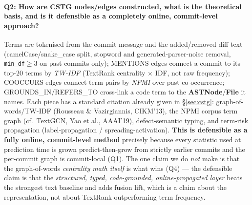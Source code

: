 \documentclass[11pt,a4paper]{article}
\newcommand{\code}[1]{\texttt{#1}}
\newcommand{\node}[1]{\textcolor{kgblue}{\textbf{#1}}}
\newcommand{\edge}[1]{\textsc{#1}}
\begin{document}
	\paragraph{Q2: How are CSTG nodes/edges constructed, what is the theoretical
	basis, and is it defensible as a completely online, commit-level approach?}
	Terms are tokenised from the commit message and the added/removed diff text
	(camelCase/snake\_case split, stopword and generated-parser-noise removal,
	\code{min\_df}$\ge3$ on past commits only); \edge{MENTIONS} edges connect a commit
	to its top-$20$ terms by \emph{TW-IDF} (TextRank centrality $\times$ IDF, not raw
	frequency); \edge{COOCCURS} edges connect term pairs by \emph{NPMI} over past
	co-occurrence; \edge{GROUNDS\_IN}/\edge{REFERS\_TO} cross-link a code term to the
	\node{ASTNode}/\node{File} it names. Each piece has a standard citation already
	given in \S\ref{sec:cstg}: graph-of-words/TW-IDF (Rousseau \& Vazirgiannis,
	CIKM'13), the NPMI corpus term graph (cf.\ TextGCN, Yao et al., AAAI'19),
	defect-semantic typing, and term-risk propagation (label-propagation /
	spreading-activation). \textbf{This is defensible as a fully online, commit-level
	method} precisely because every statistic used at prediction time is grown
	predict-then-grow from strictly earlier commits and the per-commit graph is
	commit-local (Q1). The one claim we do \emph{not} make is that the
	graph-of-words \emph{centrality math itself} is what wins (Q4) --- the defensible
	claim is that the \emph{structured, typed, code-grounded, online-propagated
	layer} beats the strongest text baseline and adds fusion lift, which is a claim
	about the representation, not about TextRank outperforming term frequency.
\end{document}
